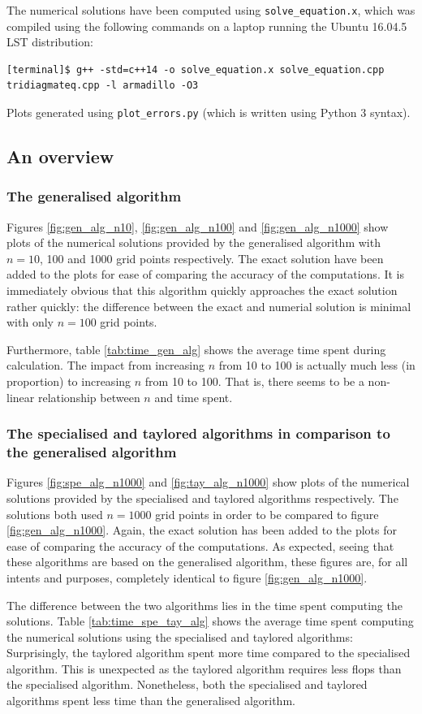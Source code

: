\documentclass[reprint,english]{revtex4-1}
\begin{document}
The numerical solutions have been computed using \texttt{solve\_equation.x}, which was compiled using the following commands on a laptop running the Ubuntu 16.04.5 LST distribution:
\begin{lstlisting}
[terminal]$ g++ -std=c++14 -o solve_equation.x solve_equation.cpp
tridiagmateq.cpp -l armadillo -O3
\end{lstlisting}
Plots generated using \texttt{plot\_errors.py} (which is written using Python 3 syntax).
\subsection{An overview}
\subsubsection{The generalised algorithm}
Figures \ref{fig:gen_alg_n10}, \ref{fig:gen_alg_n100} and \ref{fig:gen_alg_n1000} show plots of the numerical solutions provided by the generalised algorithm with \(n=10\), 100 and 1000 grid points respectively. The exact solution have been added to the plots for ease of comparing the accuracy of the computations. It is immediately obvious that this algorithm quickly approaches the exact solution rather quickly: the difference between the exact and numerial solution is minimal with only \(n=100\) grid points.

Furthermore, table \ref{tab:time_gen_alg} shows the average time spent during calculation. The impact from increasing \(n\) from 10 to 100 is actually much less (in proportion) to increasing \(n\) from 10 to 100. That is, there seems to be a non-linear relationship between \(n\) and time spent.
\subsubsection{The specialised and taylored algorithms in comparison to the generalised algorithm}
Figures \ref{fig:spe_alg_n1000} and \ref{fig:tay_alg_n1000} show plots of the numerical solutions provided by the specialised and taylored algorithms respectively. The solutions both used \(n=1000\) grid points in order to be compared to figure \ref{fig:gen_alg_n1000}. Again, the exact solution has been added to the plots for ease of comparing the accuracy of the computations. As expected, seeing that these algorithms are based on the generalised algorithm, these figures are, for all intents and purposes, completely identical to figure \ref{fig:gen_alg_n1000}.

The difference between the two algorithms lies in the time spent computing the solutions. Table \ref{tab:time_spe_tay_alg} shows the average time spent computing the numerical solutions using the specialised and taylored algorithms: Surprisingly, the taylored algorithm spent more time compared to the specialised algorithm. This is unexpected as the taylored algorithm requires less flops than the specialised algorithm. Nonetheless, both the specialised and taylored algorithms spent less time than the generalised algorithm.
\end{document}
